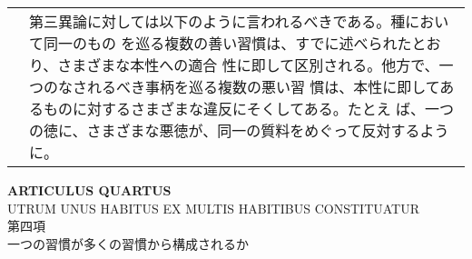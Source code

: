 \documentclass[10pt]{jsarticle}
\begin{document}
\begin{longtable}{p{21em}p{21em}}
&

第三異論に対しては以下のように言われるべきである。種において同一のもの
を巡る複数の善い習慣は、すでに述べられたとおり、さまざまな本性への適合
性に即して区別される。他方で、一つのなされるべき事柄を巡る複数の悪い習
慣は、本性に即してあるものに対するさまざまな違反にそくしてある。たとえ
ば、一つの徳に、さまざまな悪徳が、同一の質料をめぐって反対するように。

\\

\end{longtable}
\newpage

\begin{center}
{\Large {\bf ARTICULUS QUARTUS}}\\
{\large UTRUM UNUS HABITUS EX MULTIS HABITIBUS CONSTITUATUR}\\
{\Large 第四項\\一つの習慣が多くの習慣から構成されるか}
\end{center}
\end{document}
